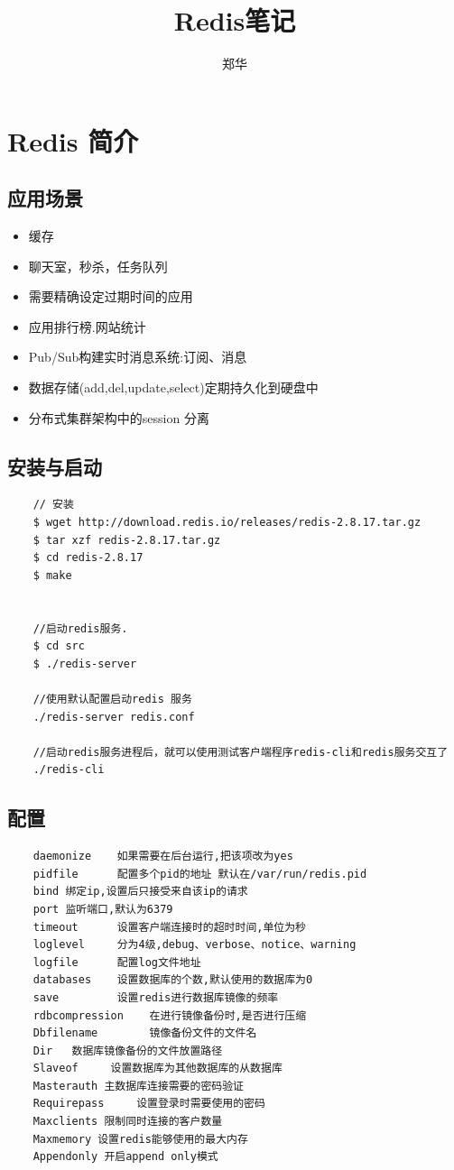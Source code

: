 \documentclass[UTF8,a4paper,12pt]{ctexbook}
\author{\kaishu 郑华}
\title{\heiti Redis笔记}
\begin{document}
 	\maketitle
  

\chapter{Redis 简介}
	\section{应用场景}
		\begin{itemize}
			\item 缓存
			\item 聊天室，秒杀，任务队列
			\item 需要精确设定过期时间的应用
			\item 应用排行榜.网站统计
			\item Pub/Sub构建实时消息系统:订阅、消息
			\item 数据存储(add,del,update,select)定期持久化到硬盘中
			\item 分布式集群架构中的session 分离
		\end{itemize}
		
	\section{安装与启动}
		\begin{lstlisting}
	// 安装
	$ wget http://download.redis.io/releases/redis-2.8.17.tar.gz
	$ tar xzf redis-2.8.17.tar.gz
	$ cd redis-2.8.17
	$ make	
	
	
	//启动redis服务.
	$ cd src
	$ ./redis-server
	
	//使用默认配置启动redis	服务
	./redis-server redis.conf
	
	//启动redis服务进程后，就可以使用测试客户端程序redis-cli和redis服务交互了	
	./redis-cli		
		\end{lstlisting}
	
	\section{配置}
		\begin{lstlisting}
	daemonize    如果需要在后台运行,把该项改为yes  
	pidfile      配置多个pid的地址 默认在/var/run/redis.pid
	bind 绑定ip,设置后只接受来自该ip的请求
	port 监听端口,默认为6379
	timeout      设置客户端连接时的超时时间,单位为秒
	loglevel     分为4级,debug、verbose、notice、warning
	logfile      配置log文件地址
	databases    设置数据库的个数,默认使用的数据库为0
	save         设置redis进行数据库镜像的频率
	rdbcompression    在进行镜像备份时,是否进行压缩
	Dbfilename        镜像备份文件的文件名
	Dir   数据库镜像备份的文件放置路径
	Slaveof     设置数据库为其他数据库的从数据库
	Masterauth 主数据库连接需要的密码验证
	Requirepass     设置登录时需要使用的密码
	Maxclients 限制同时连接的客户数量
	Maxmemory 设置redis能够使用的最大内存
	Appendonly 开启append only模式	
		\end{lstlisting}
\end{document}

